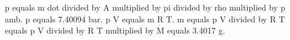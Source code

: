 p equals m dot divided by A multiplied by pi divided by rho multiplied by p amb.  
p equals 7.40094 bar.  
p V equals m R T.  
m equals p V divided by R T equals p V divided by R T multiplied by M equals 3.4017 g.